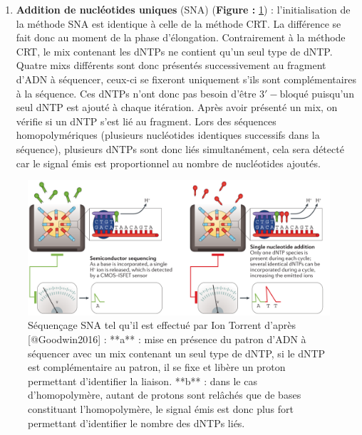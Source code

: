 \documentclass[12pt,twoside]{ugathesis}
\providecommand{\tightlist}{%
  \setlength{\itemsep}{0pt}\setlength{\parskip}{0pt}}
\theoremstyle{definition}
\theoremstyle{definition}
\theoremstyle{remark}
\begin{document}
\newpage

\begin{enumerate}
\def\labelenumi{\alph{enumi}.}
\setcounter{enumi}{1}
\tightlist
\item
  \textbf{Addition de nucléotides uniques} (SNA) (\textbf{Figure :
  }\ref{fig:snaSeq}) : l'initialisation de la méthode SNA est identique
  à celle de la méthode CRT. La différence se fait donc au moment de la
  phase d'élongation. Contrairement à la méthode CRT, le mix contenant
  les dNTPs ne contient qu'un seul type de dNTP. Quatre mixs différents
  sont donc présentés successivement au fragment d'ADN à séquencer,
  ceux-ci se fixeront uniquement s'ils sont complémentaires à la
  séquence. Ces dNTPs n'ont donc pas besoin d'être
  \(\mathrm{3'-bloqué}\) puisqu'un seul dNTP est ajouté à chaque
  itération. Après avoir présenté un mix, on vérifie si un dNTP s'est
  lié au fragment. Lors des séquences homopolymériques (plusieurs
  nucléotides identiques successifs dans la séquence), plusieurs dNTPs
  sont donc liés simultanément, cela sera détecté car le signal émis est
  proportionnel au nombre de nucléotides ajoutés.
\end{enumerate}

\begin{figure}

{\centering \includegraphics[scale=.26]{figure/SNA_seq_ionTorrent} 

}

\caption[Séquençage SNA tel qu'il est effectué par Ion Torrent]{Séquençage SNA tel qu'il est effectué par Ion Torrent d'après [@Goodwin2016] : **a** : mise en présence du patron d'ADN à séquencer avec un mix contenant un seul type de dNTP, si le dNTP est complémentaire au patron, il se fixe et libère un proton permettant d'identifier la liaison. **b** : dans le cas d'homopolymère, autant de protons sont relâchés que de bases constituant l'homopolymère, le signal émis est donc plus fort permettant d'identifier le nombre des dNTPs liés.}\label{fig:snaSeq}
\end{figure}
\end{document}

